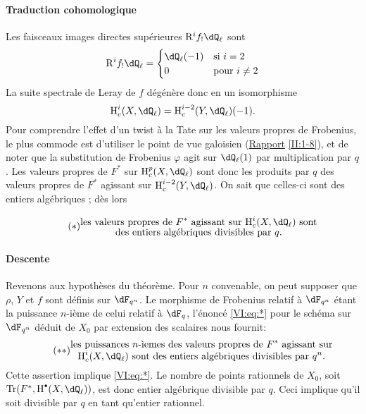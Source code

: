 \paragraph{Traduction cohomologique}
Les faisceaux images directes supérieures $\eR^i f_!\dQ_\ell$ sont 
\[
  \eR^i f_!\dQ_\ell = \begin{cases}
                       \dQ_\ell(-1) & \text{si $i = 2$} \\
                       0            & \text{pour $i\ne 2$}
                     \end{cases}
\]
La suite spectrale de Leray de $f$ dégénère donc en un isomorphisme 
\[
  \h_c^i(X,\dQ_\ell) = \h_c^{i-2}(Y,\dQ_\ell)(-1) \text{.}
\]
Pour comprendre l'effet d'un twist à la Tate sur les valeurs propres de 
Frobenius, le plus commode est d'utiliser le point de vue galoisien 
(\hyperref[II]{Rapport} \ref{II:1-8}), et de noter que la substitution de 
Frobenius $\varphi$ agit sur $\dQ_\ell(1)$ par multiplication par $q$. Les 
valeurs propres de $F^\ast$ sur $\h_c^p(X,\dQ_\ell)$ sont donc les produits par 
$q$ des valeurs propres de $F^\ast$ agissant sur $\h_c^{i-2}(Y,\dQ_\ell)$. On 
sait que celles-ci sont des entiers algébriques \cite[XXI 5.2.2]{sga7}; dès 
lors 

\begin{equation*}\tag{$*$}\label{VI:eq:*}
  \substack{\displaystyle\text{les valeurs propres de $F^\ast$ agissant sur $\h_c^i(X,\dQ_\ell)$ sont} \\
  \displaystyle\text{des entiers algébriques divisibles par $q$.}}
\end{equation*}


\paragraph{Descente}
Revenons aux hypothèses du théorème. Pour $n$ convenable, on peut 
supposer que $\rho$, $Y$ et $f$ sont définis sur $\dF_{q^n}$. Le morphisme de 
Frobenius relatif à $\dF_{q^n}$ étant la puissance $n$-ième de celui 
relatif à $\dF_q$, l'énoncé \eqref{VI:eq:*} pour le schéma sur 
$\dF_{q^n}$ déduit de $X_0$ par extension des scalaires nous fournit: 
\begin{equation*}\tag{$**$}\label{VI:eq:**}
  \substack{\displaystyle\text{les puissances $n$-\`iemes des valeurs propres de $F^\ast$ agissant sur} \\ \displaystyle\text{$\h_c^i(X,\dQ_\ell)$ sont des entiers algébriques divisibles par $q^n$.}}
\end{equation*}
Cette assertion implique \eqref{VI:eq:*}. Le nombre de points rationnels de 
$X_0$, soit $\tr(F^\ast,\h^\bullet(X,\dQ_\ell))$, est donc entier 
algébrique divisible par $q$. Ceci implique qu'il soit divisible par $q$ en 
tant qu'entier rationnel. 





